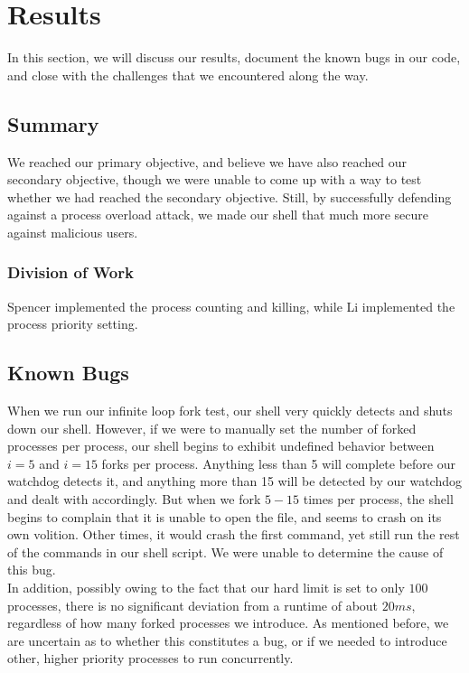 \documentclass{article}
\begin{document}


\section{Results}

In this section, we will discuss our results, document the known bugs in our 
code, and close with the challenges that we encountered along the way. \\ 

\subsection{Summary}
We reached our primary objective, and believe we have also reached our 
secondary objective, though we were unable to come up with a way to test 
whether we had reached the secondary objective. Still, by successfully 
defending against a process overload attack, we made our shell that much more
secure against malicious users.

\subsubsection{Division of Work}
Spencer implemented the process counting and killing, while Li implemented the
process priority setting. \\

\subsection{Known Bugs}
When we run our infinite loop fork test, our shell very quickly detects and
shuts down our shell. However, if we were to manually set the number of forked 
processes per process, our shell begins to exhibit undefined behavior between 
$i = 5$ and $i = 15$ forks per process. Anything less than 5 will complete
before our watchdog detects it, and anything more than 15 will be detected by
our watchdog and dealt with accordingly. But when we fork $5 - 15$ times per
process, the shell begins to complain that it is unable to open the file, and
seems to crash on its own volition. Other times, it would crash the first 
command, yet still run the rest of the commands in our shell script. We were 
unable to determine the cause of this bug.\\
In addition, possibly owing to the fact that our hard limit is set to only
$100$ processes, there is no significant deviation from a runtime of about
$20ms$, regardless of how many forked processes we introduce. As mentioned 
before, we are uncertain as to whether this constitutes a bug, or if we needed
to introduce other, higher priority processes to run concurrently. \\
\end{document}
